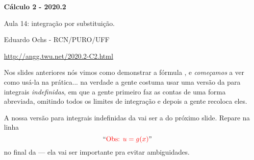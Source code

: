 \documentclass[oneside,12pt]{article}
\begin{document}
\def\Sthree{
  \iequationbox {\Intx{a}{b}{f(g(x))g'(x)}}
                {\Intu{g(a)}{g(b)}{f(u)}}
}
\def\SthreeI{
  \iequationbox {\intx{f(g(x))g'(x)}}
                {\intu{f(u)}
                 \qquad [u=g(x)]
                }
}

\def\Sthree{
  \pmat{
    \D \Intx{a}{b}{f(g(x))g'(x)} \\
    \veq \\
    \D \Intu{g(a)}{g(b)}{f(u)}
  }}

\def\SthreeI{
  \pmat{
    \D \intx{f(g(x))g'(x)} \\
       \veq \\
    \D \intu{f(u)} \\
    \text{Obs: $u=g(x)$.} \\
  }}



\def\Subst#1{\bmat{#1}}




%

\thispagestyle{empty}

\begin{center}

\vspace*{1.2cm}

{\bf \Large Cálculo 2 - 2020.2}

\bsk

Aula 14: integração por substituição.

\bsk

Eduardo Ochs - RCN/PURO/UFF

\url{http://angg.twu.net/2020.2-C2.html}

\end{center}

\newpage

Nos slides anteriores nós vimos como demonstrar a fórmula , e
{\sl começamos} a ver como usá-la na prática... na verdade a gente
costuma usar uma versão da  para integrais {\sl indefinidas},
em que a gente primeiro faz as contas de uma forma abreviada, omitindo
todos os limites de integração e depois a gente recoloca eles.

A nossa versão para integrais indefinidas da  vai ser a
 do próximo slide. Repare na linha
%
$$\text{``\Rd{Obs: $u=g(x)$}''}$$
%
no final da  --- ela vai ser importante pra evitar
ambiguidades.
\end{document}
